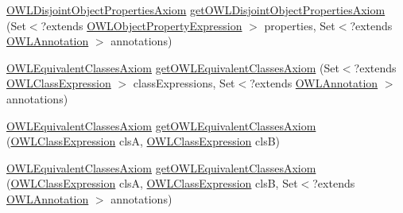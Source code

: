 \begin{DoxyCompactItemize}
\item 
\hyperlink{interfaceorg_1_1semanticweb_1_1owlapi_1_1model_1_1_o_w_l_disjoint_object_properties_axiom}{O\-W\-L\-Disjoint\-Object\-Properties\-Axiom} \hyperlink{classuk_1_1ac_1_1manchester_1_1cs_1_1owl_1_1owlapi_1_1_o_w_l_data_factory_impl_abf926630755b1f0be20ab69825569501}{get\-O\-W\-L\-Disjoint\-Object\-Properties\-Axiom} (Set$<$?extends \hyperlink{interfaceorg_1_1semanticweb_1_1owlapi_1_1model_1_1_o_w_l_object_property_expression}{O\-W\-L\-Object\-Property\-Expression} $>$ properties, Set$<$?extends \hyperlink{interfaceorg_1_1semanticweb_1_1owlapi_1_1model_1_1_o_w_l_annotation}{O\-W\-L\-Annotation} $>$ annotations)
\item 
\hyperlink{interfaceorg_1_1semanticweb_1_1owlapi_1_1model_1_1_o_w_l_equivalent_classes_axiom}{O\-W\-L\-Equivalent\-Classes\-Axiom} \hyperlink{classuk_1_1ac_1_1manchester_1_1cs_1_1owl_1_1owlapi_1_1_o_w_l_data_factory_impl_a992f2aa64e7d445971e0ae28aff9aced}{get\-O\-W\-L\-Equivalent\-Classes\-Axiom} (Set$<$?extends \hyperlink{interfaceorg_1_1semanticweb_1_1owlapi_1_1model_1_1_o_w_l_class_expression}{O\-W\-L\-Class\-Expression} $>$ class\-Expressions, Set$<$?extends \hyperlink{interfaceorg_1_1semanticweb_1_1owlapi_1_1model_1_1_o_w_l_annotation}{O\-W\-L\-Annotation} $>$ annotations)
\item 
\hyperlink{interfaceorg_1_1semanticweb_1_1owlapi_1_1model_1_1_o_w_l_equivalent_classes_axiom}{O\-W\-L\-Equivalent\-Classes\-Axiom} \hyperlink{classuk_1_1ac_1_1manchester_1_1cs_1_1owl_1_1owlapi_1_1_o_w_l_data_factory_impl_a240ebf24aa024d24ea721ab60a6fb5c6}{get\-O\-W\-L\-Equivalent\-Classes\-Axiom} (\hyperlink{interfaceorg_1_1semanticweb_1_1owlapi_1_1model_1_1_o_w_l_class_expression}{O\-W\-L\-Class\-Expression} cls\-A, \hyperlink{interfaceorg_1_1semanticweb_1_1owlapi_1_1model_1_1_o_w_l_class_expression}{O\-W\-L\-Class\-Expression} cls\-B)
\item 
\hyperlink{interfaceorg_1_1semanticweb_1_1owlapi_1_1model_1_1_o_w_l_equivalent_classes_axiom}{O\-W\-L\-Equivalent\-Classes\-Axiom} \hyperlink{classuk_1_1ac_1_1manchester_1_1cs_1_1owl_1_1owlapi_1_1_o_w_l_data_factory_impl_aa57ff4b2caa1dcf065174c52da9c330d}{get\-O\-W\-L\-Equivalent\-Classes\-Axiom} (\hyperlink{interfaceorg_1_1semanticweb_1_1owlapi_1_1model_1_1_o_w_l_class_expression}{O\-W\-L\-Class\-Expression} cls\-A, \hyperlink{interfaceorg_1_1semanticweb_1_1owlapi_1_1model_1_1_o_w_l_class_expression}{O\-W\-L\-Class\-Expression} cls\-B, Set$<$?extends \hyperlink{interfaceorg_1_1semanticweb_1_1owlapi_1_1model_1_1_o_w_l_annotation}{O\-W\-L\-Annotation} $>$ annotations)

\end{DoxyCompactItemize}
